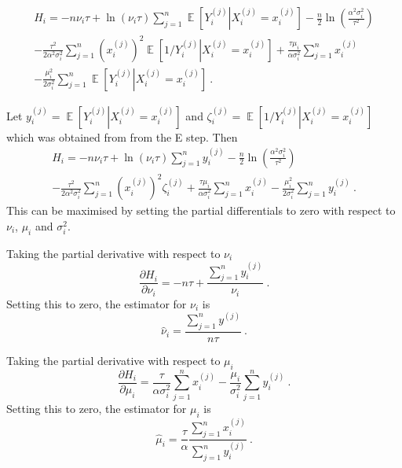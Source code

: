 \documentclass[12pt]{report}
\DeclareMathOperator{\expectation}{\mathbb{E}}
\begin{document}
\begin{multline}
H_i= -n\nu_i\tau+\ln(\nu_i\tau)\sum_{j=1}^n\expectation\left[Y_i^{(j)}\right|\left.X_i^{(j)}=x_i^{(j)}\right]-\frac{n}{2}\ln\left(\frac{\alpha^2\sigma_i^2}{\tau^2}\right)
\\
-\frac{\tau^2}{2\alpha^2\sigma_i^2}\sum_{j=1}^n\left(x_i^{(j)}\right)^2\expectation\left[1/Y_i^{(j)}\right|\left.X_i^{(j)}=x_i^{(j)}\right]
+ \frac{\tau\mu_i}{\alpha\sigma_i^2}\sum_{j=1}^nx_i^{(j)}
\\
-\frac{\mu_i^2}{2\sigma_i^2}\sum_{j=1}^n\expectation\left[Y_i^{(j)}\right|\left.X_i^{(j)}=x_i^{(j)}\right]
\ .
\end{multline}

Let $y_i^{(j)}=\expectation\left[Y_i^{(j)}\right|\left.X_i^{(j)}=x_i^{(j)}\right]$ and $\zeta_i^{(j)}=\expectation\left[1/Y_i^{(j)}\right|\left.X_i^{(j)}=x_i^{(j)}\right]$ which was obtained from from the E step. Then
\begin{multline}
H_i= -n\nu_i\tau+\ln(\nu_i\tau)\sum_{j=1}^ny_i^{(j)}-\frac{n}{2}\ln\left(\frac{\alpha^2\sigma_i^2}{\tau^2}\right)
\\
-\frac{\tau^2}{2\alpha^2\sigma_i^2}\sum_{j=1}^n\left(x_i^{(j)}\right)^2\zeta_i^{(j)}
+ \frac{\tau\mu_i}{\alpha\sigma_i^2}\sum_{j=1}^nx_i^{(j)}
-\frac{\mu_i^2}{2\sigma_i^2}\sum_{j=1}^ny_i^{(j)}
\ .
\end{multline}
This can be maximised by setting the partial differentials to zero with respect to $\nu_i$, $\mu_i$ and $\sigma_i^2$.

Taking the partial derivative with respect to $\nu_i$
\begin{equation}
\frac{\partial H_i}{\partial \nu_i}=-n\tau+\frac{\sum_{j=1}^ny_i^{(j)}}{\nu_i} \ .
\end{equation}
Setting this to zero, the estimator for $\nu_i$ is
\begin{equation}
\widehat{\nu}_i=\frac{\sum_{j=1}^ny^{(j)}}{n\tau} \ .
\end{equation}

Taking the partial derivative with respect to $\mu_i$
\begin{equation}
\frac{\partial H_i}{\partial \mu_i} = \frac{\tau}{\alpha\sigma_i^2}\sum_{j=1}^nx_i^{(j)}-\frac{\mu_i}{\sigma_i^2}\sum_{j=1}^n y_i^{(j)} \ .
\end{equation}
Setting this to zero, the estimator for $\mu_i$ is
\begin{equation}
\widehat{\mu}_i=\frac{\tau}{\alpha} \frac{\sum_{j=1}^n x_i^{(j)}}{\sum_{j=1}^n y_i^{(j)}} \ .
\end{equation}
\end{document}
